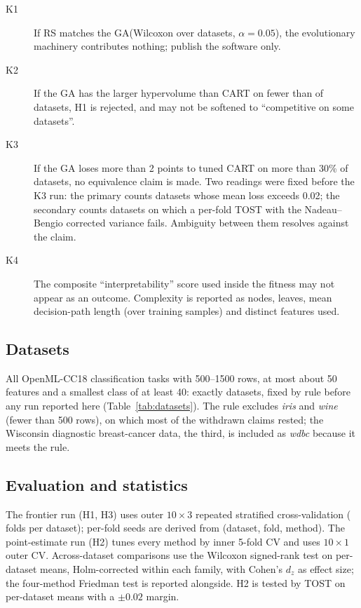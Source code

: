 \documentclass[11pt]{article}
\newcommand{\GA}{GA\xspace}
\newcommand{\RS}{RS\xspace}
\begin{document}
\begin{description}
\item[K1] If \RS{} matches the \GA (Wilcoxon over datasets, $\alpha=0.05$), the
evolutionary machinery contributes nothing; publish the software only.
\item[K2] If the \GA has the larger hypervolume than CART on fewer than
\KtwoThreshold{} of datasets, H1 is rejected, and may not be softened to ``competitive on
some datasets''.
\item[K3] If the \GA loses more than 2 points to tuned CART on more than 30\% of
datasets, no equivalence claim is made. Two readings were fixed before the K3 run: the
primary counts datasets whose mean loss exceeds 0.02; the secondary counts datasets on
which a per-fold TOST with the Nadeau--Bengio corrected variance fails. Ambiguity between
them resolves against the claim.
\item[K4] The composite ``interpretability'' score used inside the fitness may not appear
as an outcome. Complexity is reported as nodes, leaves, mean decision-path length (over
training samples) and distinct features used.
\end{description}

\subsection{Datasets}
All OpenML-CC18 \citep{bischl2021,vanschoren2014} classification tasks with 500--1500
rows, at most about 50 features and a smallest class of at least 40: exactly
\NDatasetsListed{} datasets, fixed by rule before any run reported here
(Table~\ref{tab:datasets}). The rule excludes \emph{iris} and \emph{wine} (fewer than 500
rows), on which most of the withdrawn claims rested; the Wisconsin diagnostic
breast-cancer data, the third, is included as \emph{wdbc} because it meets the rule.

\begin{table}[t]
  \centering
  \caption{The pre-registered datasets: all OpenML-CC18 classification tasks meeting the
  selection rule, in increasing size.}
  \label{tab:datasets}
  \small
  
\end{table}

\subsection{Evaluation and statistics}
The frontier run (H1, H3) uses outer $10\times3$ repeated stratified cross-validation
(\NFoldsFrontier{} folds per dataset); per-fold seeds are derived from (dataset, fold,
method). The point-estimate run (H2) tunes every method by inner 5-fold CV and uses
$10\times1$ outer CV. Across-dataset comparisons use the Wilcoxon signed-rank test on
per-dataset means, Holm-corrected within each family, with Cohen's $d_z$ as effect size;
the four-method Friedman test is reported alongside. H2 is tested by TOST on per-dataset
means with a $\pm0.02$ margin.
\end{document}

